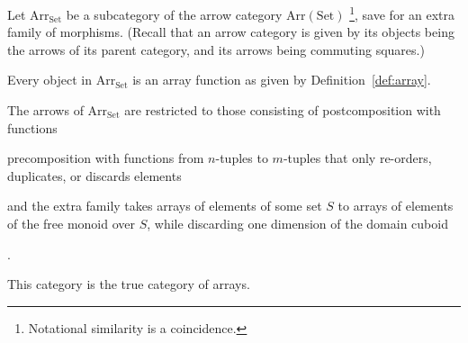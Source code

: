 \documentclass{DIKU-report-variant}
\newcommand\mrm[1]{\mathrm{#1}}
\newcommand\brm[1]{\bm{\mrm{#1}}}
\newcommand\Nat{\mathbb{N}}
\newcommand\Arr[1]{{\brm{Arr}_{\brm{#1}}}}
\begin{document}
\begin{definition}
  \label{def:category-of-arrays}
   
  Let \(\Arr{\brm{Set}}\) be a subcategory of the arrow category \(\mathrm{Arr}(\brm{Set})\)
  \footnote{Notational similarity is a coincidence.}, save for an extra family of morphisms.
  (Recall that an arrow category is given by its objects being the arrows of its parent category,
  and its arrows being commuting squares.)

  Every object in \(\Arr{\brm{Set}}\) is an array function as given by Definition~\ref{def:array}.

  The arrows of \(\Arr{\brm{Set}}\) are restricted to those consisting of postcomposition with
  functions
  \begin{center}
  \end{center}
  precomposition with functions from \(n\)-tuples to \(m\)-tuples
  that only re-orders, duplicates, or discards elements
  \begin{center}
  \end{center}
  and the extra family takes arrays of elements of some set \(S\) to arrays
  of elements of the free monoid over \(S\), while discarding one dimension of
  the domain cuboid
  \begin{center}
    .
  \end{center}
  
  This category is the true category of arrays.
\end{definition}
\end{document}
